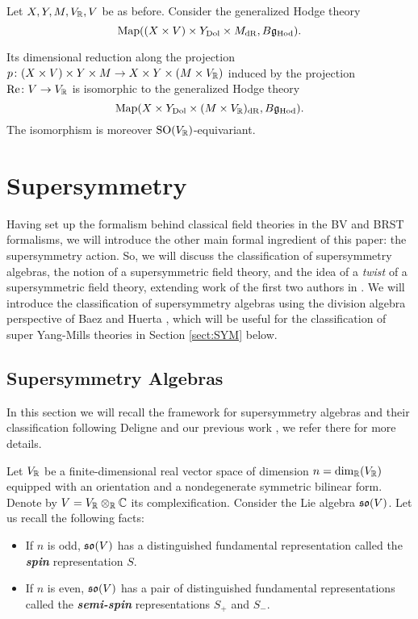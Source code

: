 \documentclass[10pt, oneside]{article}
\newcommand{\Hod}{\mathrm{Hod}}
\renewcommand{\Re}{\mathrm{Re}}
\newcommand{\defterm}[1]{\textbf{\emph{#1}}}
\begin{document}
\begin{corollary}
Let $X, Y, M, V_\mathbb R, V$ be as before. Consider the generalized Hodge theory
\[\map((X\times V)\times Y_{\mr{Dol}}\times M_{\mr{dR}}, B\fg_\Hod).\]

Its dimensional reduction along the projection $p\colon (X\times V)\times Y\times M\rightarrow X\times Y\times (M\times V_\mathbb R)$ induced by the projection $\Re\colon V\rightarrow V_\RR$ is isomorphic to the generalized Hodge theory
\[\map(X\times Y_{\mr{Dol}}\times (M\times V_\RR)_{\mr{dR}}, B\fg_\Hod).\]
The isomorphism is moreover $\mathrm{SO}(V_\mathbb R)$-equivariant.
\label{cor:Hodgeholomorphicreduction}
\end{corollary}

\section{Supersymmetry} \label{sect:susy}
Having set up the formalism behind classical field theories in the BV and BRST formalisms, we will introduce the other main formal ingredient of this paper: the supersymmetry action.  So, we will discuss the classification of supersymmetry algebras, the notion of a supersymmetric field theory, and the idea of a \emph{twist} of a supersymmetric field theory, extending work of the first two authors in \cite{ElliottSafronov}.  We will introduce the classification of supersymmetry algebras using the division algebra perspective of Baez and Huerta \cite{BaezHuerta}, which will be useful for the classification of super Yang-Mills theories in Section \ref{sect:SYM} below.

\subsection{Supersymmetry Algebras} \label{sect:susyalgebras}
In this section we will recall the framework for supersymmetry algebras and their classification following Deligne \cite{DeligneSpinors} and our previous work \cite{ElliottSafronov}, we refer there for more details.

Let $V_\mathbb R$ be a finite-dimensional real vector space of dimension $n=\dim_\mathbb R(V_\mathbb R)$ equipped with an orientation and a nondegenerate symmetric bilinear form. Denote by $V=V_\mathbb R\otimes_\mathbb R\mathbb C$ its complexification. Consider the Lie algebra $\mathfrak{so}(V)$. Let us recall the following facts:
\begin{itemize}
\item If $n$ is odd, $\mathfrak{so}(V)$ has a distinguished fundamental representation called the \defterm{spin} representation $S$.

\item If $n$ is even, $\mathfrak{so}(V)$ has a pair of distinguished fundamental representations called the \defterm{semi-spin} representations $S_+$ and $S_-$.
\end{itemize}
\end{document}
